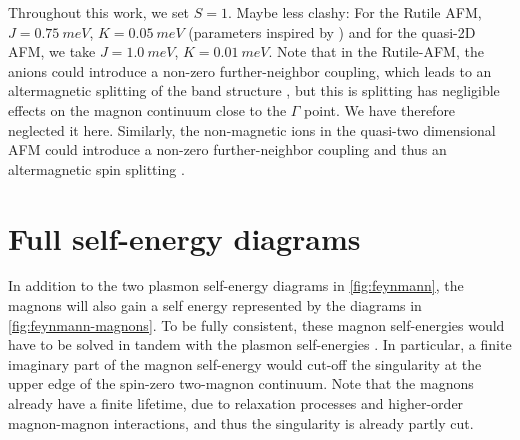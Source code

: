 \documentclass[aps,prb,reprint,twocolumns,superscriptaddress,nofootinbib]{revtex4-2}
\newcommand{\Jexchange}{\SI{0.75}{meV}}
\newcommand{\Kani}{\SI{0.05}{meV}}
\newcommand{\Jexchangecupr}{\SI{1.0}{meV}}
\newcommand{\Kanicupr}{\SI{0.01}{meV}}
\begin{document}
	
	Throughout this work, we set $S=1$. Maybe less clashy: For the Rutile AFM, $J=\Jexchange$, $K=\Kani$ (parameters inspired by  \cite{rezendeIntroductionAntiferromagneticMagnons2019}) and for the quasi-2D AFM, we take $J=\Jexchangecupr$, $K=\Kanicupr$. Note that in the Rutile-AFM, the anions could introduce a non-zero further-neighbor coupling, which leads to an altermagnetic splitting of the band structure \cite{smejkalChiralMagnonsAltermagnetic2023,gohlkeSpuriousSymmetryEnhancement2023}, but this is splitting has negligible effects on the magnon continuum close to the $\Gamma$ point. We have therefore neglected it here. Similarly, the non-magnetic ions in the quasi-two dimensional AFM could introduce a non-zero further-neighbor coupling and thus an altermagnetic spin splitting \cite{brekkeTwodimensionalAltermagnetsSuperconductivity2023}.
	
	\section{Full self-energy diagrams}
	\label{app:self-energies-magnon}
	In addition to the two plasmon self-energy diagrams in \cref{fig:feynmann}, the magnons will also gain a self energy represented by the diagrams in \cref{fig:feynmann-magnons}. To be fully consistent, these magnon self-energies would have to be solved in tandem with the plasmon self-energies \cite{chernyshevSpinWavesTriangular2009}. In particular, a finite imaginary part of the magnon self-energy would cut-off the singularity at the upper edge of the spin-zero two-magnon continuum. Note that the magnons already have a finite lifetime, due to relaxation processes and higher-order magnon-magnon interactions, and thus the singularity is already partly cut.
	
\end{document}
